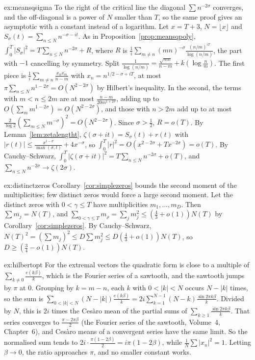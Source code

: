 \begin{solution}{ex:meansqsigma}
\idea To the right of the critical line the diagonal $\sum n^{-2\sigma}$ converges, and the off-diagonal is a power of $N$ smaller than $T$, so the same proof gives an asymptotic with a constant instead of a logarithm.
\writeup Let $x=T+3$, $N=\lfloor x\rfloor$ and $S_\sigma(t)=\sum_{n\le N}n^{-\sigma-it}$. As in Proposition~\ref{prop:meansqpoly}, $\int_0^T|S_\sigma|^2=T\sum_{n\le N}n^{-2\sigma}+R$, where $R$ is $\frac1i\sum_{m\ne n}(mn)^{-\sigma}\frac{(n/m)^{iT}}{\log(n/m)}$, the part with $-1$ cancelling by symmetry. Split $\frac1{\log(n/m)}=\frac{\sqrt{mn}}{n-m}+k(\log\frac nm)$. The first piece is $\frac1i\sum_{m\ne n}\frac{x_n\overline{x_m}}{n-m}$ with $x_n=n^{1/2-\sigma+iT}$, at most $\pi\sum_{n\le N}n^{1-2\sigma}=O(N^{2-2\sigma})$ by Hilbert's inequality. In the second, the terms with $m<n\le2m$ are at most $\frac{n-m}{20m^{1+2\sigma}}$, adding up to $O(\sum_mm^{1-2\sigma})=O(N^{2-2\sigma})$, and those with $n>2m$ add up to at most $\frac2{\log2}(\sum_{m\le N}m^{-\sigma})^2=O(N^{2-2\sigma})$. Since $\sigma>\frac12$, $R=o(T)$.
By Lemma~\ref{lem:zetalengtht}, $\zeta(\sigma+it)=S_\sigma(t)+r(t)$ with $|r(t)|\le\frac{x^{1-\sigma}}{\max(\sigma,t)}+4x^{-\sigma}$, so $\int_0^T|r|^2=O(x^{2-2\sigma}+Tx^{-2\sigma})=o(T)$. By Cauchy--Schwarz, $\int_0^T|\zeta(\sigma+it)|^2=T\sum_{n\le N}n^{-2\sigma}+o(T)$, and $\sum_{n\le N}n^{-2\sigma}\to\zeta(2\sigma)$.
\end{solution}

\begin{solution}{ex:distinctzeros}
\idea Corollary~\ref{cor:simplezeros} bounds the second moment of the multiplicities; few distinct zeros would force a large second moment.
\writeup Let the distinct zeros with $0<\gamma\le T$ have multiplicities $m_1,\dots,m_D$. Then $\sum m_j=N(T)$, and $\sum_{0<\gamma\le T}m_\rho=\sum_jm_j^2\le(\frac43+o(1))N(T)$ by Corollary~\ref{cor:simplezeros}. By Cauchy--Schwarz, $N(T)^2=(\sum m_j)^2\le D\sum m_j^2\le D(\frac43+o(1))N(T)$, so $D\ge(\frac34-o(1))N(T)$.
\end{solution}

\begin{solution}{ex:hilbertopt}
\idea For the extremal vectors the quadratic form is close to a multiple of $\sum_{k\ne0}\frac{e(k\beta)}k$, which is the Fourier series of a sawtooth, and the sawtooth jumps by $\pi$ at $0$.
\writeup Grouping by $k=m-n$, each $k$ with $0<|k|<N$ occurs $N-|k|$ times, so the sum is $\sum_{0<|k|<N}(N-|k|)\frac{e(k\beta)}k=2i\sum_{k=1}^{N-1}(N-k)\frac{\sin2\pi k\beta}k$. Divided by $N$, this is $2i$ times the Cesàro mean of the partial sums of $\sum_{k\ge1}\frac{\sin2\pi k\beta}k$. That series converges to $\frac{\pi-2\pi\beta}2$ (the Fourier series of the sawtooth, Volume~4, Chapter~6), and Cesàro means of a convergent series have the same limit. So the normalised sum tends to $2i\cdot\frac{\pi(1-2\beta)}2=i\pi(1-2\beta)$, while $\frac1N\sum|x_n|^2=1$. Letting $\beta\to0$, the ratio approaches $\pi$, and no smaller constant works.
\end{solution}


